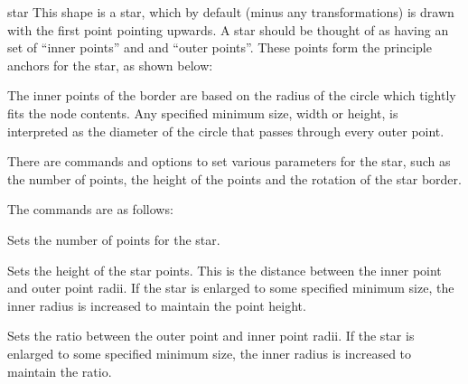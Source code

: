 \begin{shape}{star}
  This shape is a star, which by default (minus any transformations) is
  drawn with the first point pointing	upwards.
  A star should be thought of as having an set of ``inner points'' and
  and ``outer points''. These points form the principle anchors for the
  star, as shown below:	
  
\begin{codeexample}[]
\Huge
{}
\end{codeexample}

  The inner points of the border are based on the radius of the circle
  which tightly fits the node contents. 
  Any specified minimum size, width or height, is interpreted as the 
  diameter of the circle that passes through every outer point. 
  
  There are \pgfname{} commands and \tikzname{} options to set various
  parameters for the star, such as the number of points, the height of
  the points and the rotation of the star border. 
  
  The \pgfname{} commands are as follows:
  
  \begin{command}{\pgfsetstarpoints{}}
    Sets the number of points for the star.
  \end{command}
  
  \begin{command}{\pgfsetstarpointheight{}}
    Sets the height of the star points. This is the distance between the
    inner point and outer point radii. If the star is enlarged to some
    specified minimum size, the inner radius is increased to maintain
    the point height.	
  \end{command}
  
  \begin{command}{\pgfsetstarpointratio{}}
    Sets the ratio between the outer point and inner point radii.		
    If the star is enlarged to some specified minimum size, the
    inner radius is increased to maintain the ratio.	
  \end{command}
  

\end{shape}
